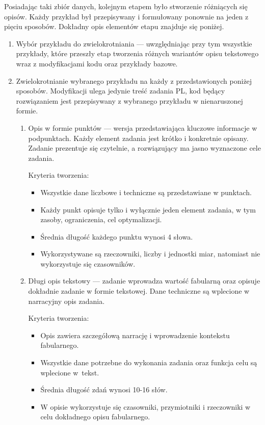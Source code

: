 Posiadając taki zbiór danych, kolejnym etapem było stworzenie różniących się opisów. Każdy przykład był przepisywany i formułowany ponownie na jeden z pięciu sposobów. Dokładny opis elementów etapu znajduje się poniżej.

\begin{enumerate}
\item Wybór przykładu do zwielokrotniania --- uwzględniając przy tym wszystkie przykłady, które przeszły etap tworzenia różnych wariantów opisu tekstowego wraz z modyfikacjami kodu oraz przykłady bazowe.
\item Zwielokrotnianie wybranego przykładu na każdy z przedstawionych poniżej sposobów. Modyfikacji ulega jedynie treść zadania PL, kod  będący rozwiązaniem jest przepisywany z wybranego przykładu w nienaruszonej formie.
\begin{enumerate}
\item Opis w formie punktów --- wersja przedstawiająca kluczowe informacje w podpunktach. Każdy element zadania jest krótko i konkretnie opisany. Zadanie prezentuje się czytelnie, a rozwiązujący ma jasno wyznaczone cele zadania.

Kryteria tworzenia:
	\begin{itemize}
		\item Wszystkie dane liczbowe i techniczne są przedstawiane w punktach.
		\item Każdy punkt opisuje tylko i wyłącznie jeden element zadania, w tym zasoby, ograniczenia, cel optymalizacji.
		\item Średnia długość każdego punktu wynosi 4 słowa.
		\item Wykorzystywane są rzeczowniki, liczby i jednostki miar, natomiast nie wykorzystuje się czasowników.
	\end{itemize}
	
\item Długi opis tekstowy --- zadanie wprowadza wartość fabularną oraz opisuje dokładnie zadanie w formie tekstowej. Dane techniczne są wplecione w narracyjny opis zadania.

Kryteria tworzenia:
	\begin{itemize}
		\item Opis zawiera szczegółową narrację i wprowadzenie kontekstu fabularnego.
		\item Wszystkie dane potrzebne do wykonania zadania oraz funkcja celu są wplecione w~tekst.
		\item Średnia długość zdań wynosi 10-16 słów.
		\item W opisie wykorzystuje się czasowniki, przymiotniki i rzeczowniki w celu dokładnego opisu fabularnego.
	\end{itemize}


\end{enumerate}
\end{enumerate}
